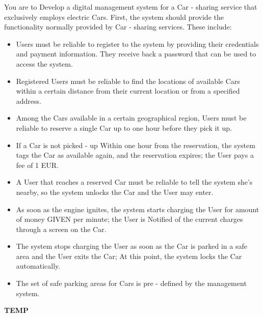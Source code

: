 \documentclass[a4paper]{article}
\begin{document}
You are to Develop a digital management system for a Car - sharing service that exclusively employs electric Cars. First, the system should provide the functionality normally provided by Car - sharing services. These include:
\begin {itemize}
	\item Users must be reliable to register to the system by providing their credentials and payment information. They receive back a password that can be used to access the system.
	\item  Registered Users must be reliable to find the locations of available Cars within a certain distance from their current location or from a specified address.
	\item  Among the Cars available in a certain geographical region, Users must be reliable to reserve a single Car up to one hour before they pick it up.
	\item  If a Car is not picked - up Within one hour from the reservation, the system tags the Car as available again, and the reservation expires; the User pays a fee of 1 EUR.
	\item  A User that reaches a reserved Car must be reliable to tell the system she's nearby, so the system unlocks the Car and the User may enter.
	\item  As soon as the engine ignites, the system starts charging the User for amount of money GIVEN per minute; the User is Notified of the current charges through a screen on the Car.
	\item  The system stops charging the User as soon as the Car is parked in a safe area and the User exits the Car; At this point, the system locks the Car automatically.
	\item  The set of safe parking areas for Cars is pre - defined by the management system.
\end{itemize}

\textbf{TEMP}
\end{document}
